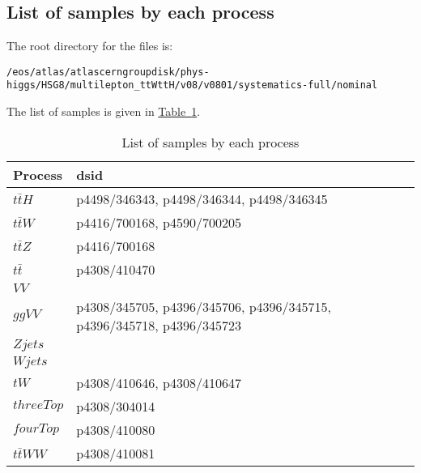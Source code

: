 \subsection{List of samples by each process}

The root directory for the files is:

{\small
\verb|/eos/atlas/atlascerngroupdisk/phys-higgs/HSG8/multilepton_ttWttH/v08/v0801/systematics-full/nominal|
}

The list of samples is given in \hyperref[tab:samples]{Table~\ref*{tab:samples}}.

\newpage

\begin{table}[h!]
    \centering
    \renewcommand{\arraystretch}{1.5}
    \caption{List of samples by each process}
    \label{tab:samples}
    \begin{tabular}{p{1.5cm}p{13.5cm}}
        \toprule
        Process      & \gls{dsid}                                                           \\
        \midrule
        $t\bar{t}H$  & p4498/346343, p4498/346344, p4498/346345                             \\
        $t\bar{t}W$  & p4416/700168, p4590/700205                                           \\
        $t\bar{t}Z$  & p4416/700168                                                         \\
        $t\bar{t}$   & p4308/410470                                                         \\
        $VV$         &                                                \\
        $ggVV$       & p4308/345705, p4396/345706, p4396/345715, p4396/345718, p4396/345723 \\
        $Zjets$      &                                             \\
        $Wjets$      &                                             \\
        $tW$         & p4308/410646, p4308/410647                                           \\
        $threeTop$   & p4308/304014                                                         \\
        $fourTop$    & p4308/410080                                                         \\
        $t\bar{t}WW$ & p4308/410081                                                         \\

\end{tabular}
\end{table}
